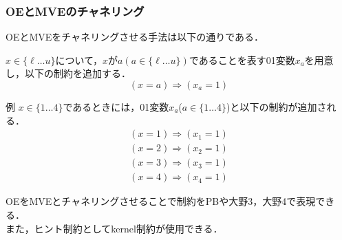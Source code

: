 \begin{frame}
    \frametitle{OEとMVEのチャネリング}\small
    OEとMVEをチャネリングさせる手法は以下の通りである．
    \begin{block}{}
        $x \in \{\ell \dots u\}$について，$x$が$a (a \in \{\ell \dots u\})$であることを表す01変数$x_{a}$を用意し，以下の制約を追加する．
        \vspace{-3mm}
        \[
            (x = a) \Rightarrow (x_{a} = 1)
        \]
    \end{block}
    \begin{exampleblock}{例}
        $x \in \{1 \dots 4\}$であるときには，01変数$x_a$($a \in \{ 1 \dots 4\}$)と以下の制約が追加される．
        \vspace{-3mm}
        \begin{eqnarray*}
            (x = 1) \Rightarrow (x_1 = 1) \\
            (x = 2) \Rightarrow (x_2 = 1) \\
            (x = 3) \Rightarrow (x_3 = 1) \\
            (x = 4) \Rightarrow (x_4 = 1)
        \end{eqnarray*}
    \end{exampleblock}
    OEをMVEとチャネリングさせることで{\alldifferent}制約をPBや大野3，大野4で表現できる．\\
    また，ヒント制約としてkernel制約が使用できる．
\end{frame}





\backupend

